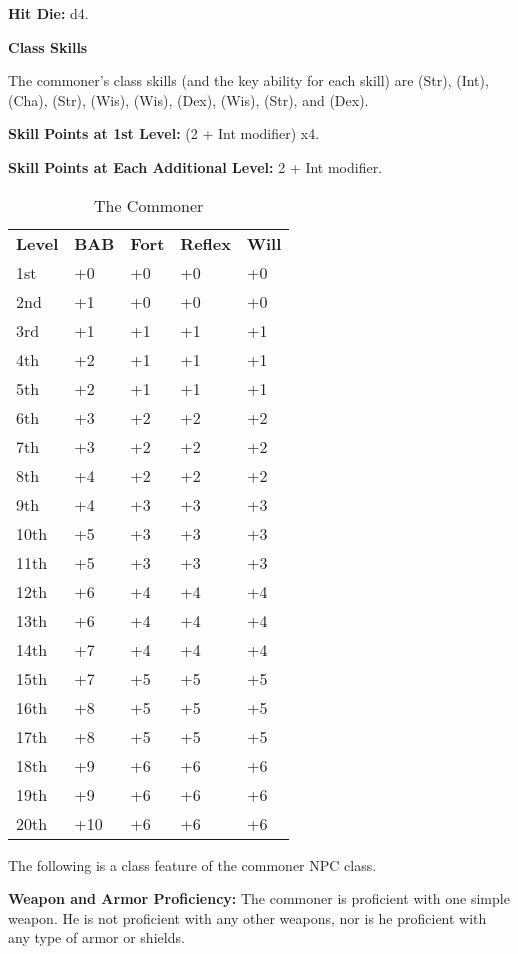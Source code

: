 
\textbf{Hit Die:} d4.

\textbf{Class Skills}

The commoner's class skills (and the key ability for each skill) are  (Str),  (Int),  (Cha),  (Str),  (Wis),  (Wis),  (Dex),  (Wis),  (Str), and  (Dex).

\textbf{Skill Points at 1st Level:} (2 + Int modifier) x4.

\textbf{Skill Points at Each Additional Level:} 2 + Int modifier.

\begin{table}[htb]
\caption{The Commoner}
\centering
\begin{tabular}{*{5}{l}}
\textbf{Level} & \textbf{BAB} & \textbf{Fort} & \textbf{Reflex} & \textbf{Will}\\
1st & +0 & +0 & +0 & +0 \\
2nd & +1 & +0 & +0 & +0 \\
3rd & +1 & +1 & +1 & +1 \\
4th & +2 & +1 & +1 & +1 \\
5th & +2 & +1 & +1 & +1 \\
6th & +3 & +2 & +2 & +2 \\
7th & +3 & +2 & +2 & +2 \\
8th & +4 & +2 & +2 & +2 \\
9th & +4 & +3 & +3 & +3 \\
10th & +5 & +3 & +3 & +3 \\
11th & +5 & +3 & +3 & +3 \\
12th & +6 & +4 & +4 & +4 \\
13th & +6 & +4 & +4 & +4 \\
14th & +7 & +4 & +4 & +4 \\
15th & +7 & +5 & +5 & +5 \\
16th & +8 & +5 & +5 & +5 \\
17th & +8 & +5 & +5 & +5 \\
18th & +9 & +6 & +6 & +6 \\
19th & +9 & +6 & +6 & +6 \\
20th & +10 & +6 & +6 & +6 \\
\end{tabular}
\end{table}

\ClassFeatures

The following is a class feature of the commoner NPC class.

\textbf{Weapon and Armor Proficiency:} The commoner is proficient with one simple weapon. He is not proficient with any other weapons, nor is he proficient with any type of armor or shields.
